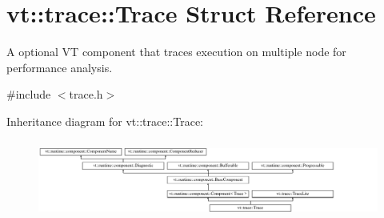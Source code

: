 \hypertarget{structvt_1_1trace_1_1_trace}{}\section{vt\+:\+:trace\+:\+:Trace Struct Reference}
\label{structvt_1_1trace_1_1_trace}


A optional VT component that traces execution on multiple node for performance analysis.  




{\ttfamily \#include $<$trace.\+h$>$}

Inheritance diagram for vt\+:\+:trace\+:\+:Trace\+:\begin{figure}[H]
\begin{center}
\leavevmode
\includegraphics[height=2.592592cm]{structvt_1_1trace_1_1_trace}
\end{center}
\end{figure}
